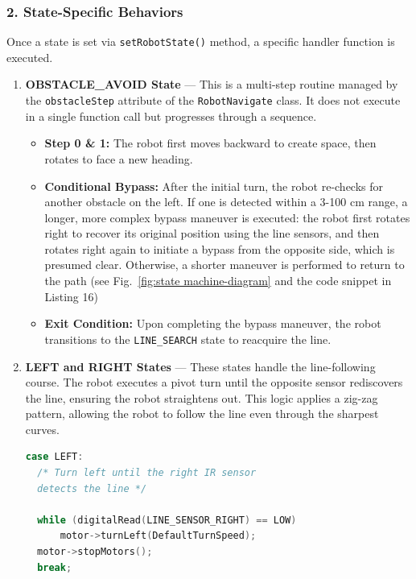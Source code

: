 \documentclass[conference]{IEEEtran}
\begin{document}
\subsubsection*{\textbf{2. State-Specific Behaviors}}

Once a state is set via \texttt{setRobotState()} method, a specific handler function is executed.

\begin{enumerate}[label=\alph*)]

\item \textbf{OBSTACLE\_AVOID State} — This is a multi-step routine managed by the \texttt{obstacleStep} attribute of the \texttt{RobotNavigate} class. It does not execute in a single function call but progresses through a sequence.

\begin{itemize}
    \item \textbf{Step 0 \& 1:} The robot first moves backward to create space, then rotates to face a new heading.
    \item \textbf{Conditional Bypass:} After the initial turn, the robot re-checks for another obstacle on the left. If one is detected within a 3-100 cm range, a longer, more complex bypass maneuver is executed: the robot first rotates right to recover its original position using the line sensors, and then rotates right again to initiate a bypass from the opposite side, which is presumed clear. Otherwise, a shorter maneuver is performed to return to the path (see Fig.~\ref{fig:state machine-diagram} and the code snippet in Listing 16)

    \item \textbf{Exit Condition:} Upon completing the bypass maneuver, the robot transitions to the \texttt{LINE\_SEARCH} state to reacquire the line.
\end{itemize}

\item \textbf{LEFT and RIGHT States} — These states handle the line-following course. The robot executes a pivot turn until the opposite sensor rediscovers the line, ensuring the robot straightens out. This logic applies a zig-zag pattern, allowing the robot to follow the line even through the sharpest curves.

\begin{lstlisting}[language=C++, caption=Line Correction Logic]
case LEFT:
  /* Turn left until the right IR sensor 
  detects the line */
  
  while (digitalRead(LINE_SENSOR_RIGHT) == LOW)
      motor->turnLeft(DefaultTurnSpeed); 
  motor->stopMotors();
  break;
  

\end{lstlisting}
\end{enumerate}
\end{document}
